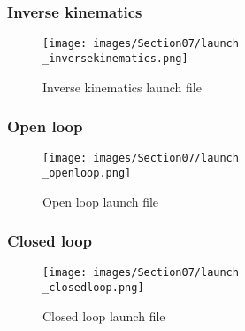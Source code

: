 \subsubsection{Inverse kinematics}
\begin{figure}[ht]
    \centering
    \texttt{[image: images/Section07/launch\\\_inversekinematics.png]}
    \caption{Inverse kinematics launch file}
    \label{fig:mesh22}
\end{figure}
\FloatBarrier

\subsubsection{Open loop}
\begin{figure}[ht]
    \centering
    \texttt{[image: images/Section07/launch\\\_openloop.png]}
    \caption{Open loop launch file}
    \label{fig:mesh23}
\end{figure}
\FloatBarrier

\subsubsection{Closed loop}
\begin{figure}[ht]
    \centering
    \texttt{[image: images/Section07/launch\\\_closedloop.png]}
    \caption{Closed loop launch file}
    \label{fig:mesh24}
\end{figure}
\FloatBarrier
